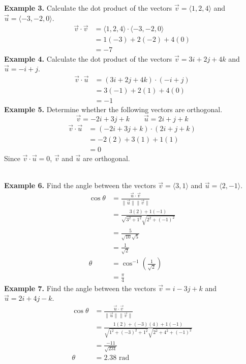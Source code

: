 \documentclass{report}
\begin{document}
\noindent\textbf{Example 3. } Calculate the dot product of the vectors $\vec{v} = \langle 1, 2, 4 \rangle$ and $\vec{u} = \langle -3, -2, 0 \rangle$.
\begin{align*}
    \vec{v} \cdot \vec{v} & = \langle 1, 2, 4 \rangle \cdot \langle -3, -2, 0 \rangle \\
                          & = 1(-3) + 2(-2) + 4(0)                                    \\
                          & = -7
\end{align*}
\noindent\textbf{Example 4. } Calculate the dot product of the vectors $\vec{v} = 3i + 2j + 4k$ and $\vec{u} = -i + j$.
\begin{align*}
    \vec{v} \cdot \vec{u} & = (3i + 2j + 4k) \cdot (-i + j) \\
                          & = 3(-1) + 2(1) + 4(0)           \\
                          & = -1
\end{align*}
\noindent\textbf{Example 5. } Determine whether the following vectors are orthogonal. \[\vec{v} = -2i + 3j + k \qquad \vec{u} = 2i + j + k\]
\begin{align*}
    \vec{v} \cdot \vec{u} & = (-2i + 3j + k) \cdot (2i + j + k) \\
                          & = -2(2) + 3(1) + 1(1)               \\
                          & = 0
\end{align*}
Since $\vec{v} \cdot \vec{u} = 0$, $\vec{v}$ and $\vec{u}$ are orthogonal.

~\\\noindent\textbf{Example 6. } Find the angle between the vectors $\vec{v} = \langle 3, 1 \rangle$ and $\vec{u} = \langle 2, -1 \rangle$.
\begin{align*}
    \cos\theta & = \frac{\vec{u} \cdot \vec{v}}{\lVert \vec{u} \rVert \lVert \vec{v} \rVert} \\
               & = \frac{3(2) + 1(-1)}{\sqrt{3^2 + 1^2}\sqrt{2^2 + (-1)^2}}                  \\
               & = \frac{5}{\sqrt{10}\sqrt{5}}                                               \\
               & = \frac{1}{\sqrt{2}}                                                        \\
    \theta     & = \cos^{-1}\left(\frac{1}{\sqrt{2}}\right)                                  \\
               & = \frac{\pi}{4}
\end{align*}
\noindent\textbf{Example 7. } Find the angle between the vectors $\vec{v} = i - 3j + k$ and $\vec{u} = 2i + 4j - k$.
\begin{align*}
    \cos\theta & = \frac{\vec{u} \cdot \vec{v}}{\lVert \vec{u} \rVert \lVert \vec{v} \rVert}         \\
               & = \frac{1(2) + (-3)(4) + 1(-1)}{\sqrt{1^2 + (-3)^2 + 1^2}\sqrt{2^2 + 4^2 + (-1)^2}} \\
               & = \frac{-11}{\sqrt{231}}                                                            \\
    \theta     & = 2.38 \text{ rad}
\end{align*}
\end{document}
